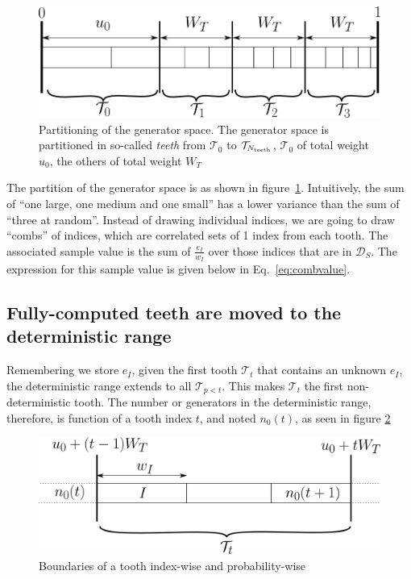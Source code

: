 \documentclass[./thesis.tex]{subfiles}
\begin{document}
 \begin{figure}[h!]
	\begin{center}
	\includegraphics[width=0.6\columnwidth]{figures/pt2/teeth}
	\end{center}
	\caption{Partitioning of the generator space.
		The generator space is partitioned in so-called \emph{teeth} from $\mathcal{T}_0$ to $\mathcal{T}_{N_\text{teeth}}$, $\mathcal{T}_0$ of total weight $u_0$, the others of total weight $W_T$}
	\label{fig:teeth}
\end{figure}

The partition of the generator space is as shown in figure~\ref{fig:teeth}.
Intuitively, the sum of ``one large, one medium and one small'' has a lower variance than the sum of ``three at random''. Instead of drawing individual indices, we are going to draw ``combs'' of indices, which are correlated sets of 1 index from each tooth. The associated sample value is the sum of $\frac{e_I}{w_I}$ over those indices that are in $\mathcal{D}_S$.  The expression for this sample value is given below in Eq.~\eqref{eq:combvalue}.

\subsection{Fully-computed teeth are moved to the deterministic range}

Remembering we store $e_I$, given the first tooth $\mathcal{T}_t$ that contains an unknown $e_I$, the deterministic range extends to all $\mathcal{T}_{p<t}$. This makes $\mathcal{T}_t$ the first non-deterministic tooth.
The number or generators in the deterministic range, therefore, is function of a tooth index $t$, and noted $n_0(t)$, as seen in figure \ref{fig:boundaries_teeth}

\begin{figure}[h!]
	\begin{center}
		\includegraphics[width=0.7\columnwidth]{figures/pt2/tooththreshold}
	\end{center}
	\caption{Boundaries of a tooth index-wise and probability-wise}
	\label{fig:boundaries_teeth}
\end{figure}
\end{document}
